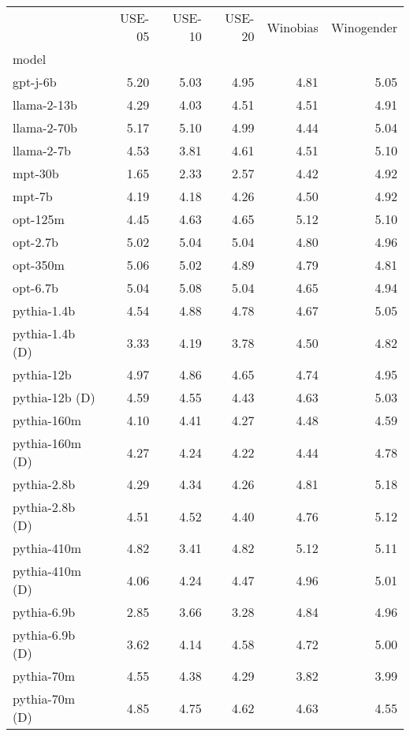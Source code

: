 \begin{tabular}{lrrrrr}
 & USE-05 & USE-10 & USE-20 & Winobias & Winogender \\
model &  &  &  &  &  \\
gpt-j-6b & 5.20 & 5.03 & 4.95 & 4.81 & 5.05 \\
llama-2-13b & 4.29 & 4.03 & 4.51 & 4.51 & 4.91 \\
llama-2-70b & 5.17 & 5.10 & 4.99 & 4.44 & 5.04 \\
llama-2-7b & 4.53 & 3.81 & 4.61 & 4.51 & 5.10 \\
mpt-30b & 1.65 & 2.33 & 2.57 & 4.42 & 4.92 \\
mpt-7b & 4.19 & 4.18 & 4.26 & 4.50 & 4.92 \\
opt-125m & 4.45 & 4.63 & 4.65 & 5.12 & 5.10 \\
opt-2.7b & 5.02 & 5.04 & 5.04 & 4.80 & 4.96 \\
opt-350m & 5.06 & 5.02 & 4.89 & 4.79 & 4.81 \\
opt-6.7b & 5.04 & 5.08 & 5.04 & 4.65 & 4.94 \\
pythia-1.4b & 4.54 & 4.88 & 4.78 & 4.67 & 5.05 \\
pythia-1.4b (D) & 3.33 & 4.19 & 3.78 & 4.50 & 4.82 \\
pythia-12b & 4.97 & 4.86 & 4.65 & 4.74 & 4.95 \\
pythia-12b (D) & 4.59 & 4.55 & 4.43 & 4.63 & 5.03 \\
pythia-160m & 4.10 & 4.41 & 4.27 & 4.48 & 4.59 \\
pythia-160m (D) & 4.27 & 4.24 & 4.22 & 4.44 & 4.78 \\
pythia-2.8b & 4.29 & 4.34 & 4.26 & 4.81 & 5.18 \\
pythia-2.8b (D) & 4.51 & 4.52 & 4.40 & 4.76 & 5.12 \\
pythia-410m & 4.82 & 3.41 & 4.82 & 5.12 & 5.11 \\
pythia-410m (D) & 4.06 & 4.24 & 4.47 & 4.96 & 5.01 \\
pythia-6.9b & 2.85 & 3.66 & 3.28 & 4.84 & 4.96 \\
pythia-6.9b (D) & 3.62 & 4.14 & 4.58 & 4.72 & 5.00 \\
pythia-70m & 4.55 & 4.38 & 4.29 & 3.82 & 3.99 \\
pythia-70m (D) & 4.85 & 4.75 & 4.62 & 4.63 & 4.55 \\
\end{tabular}
